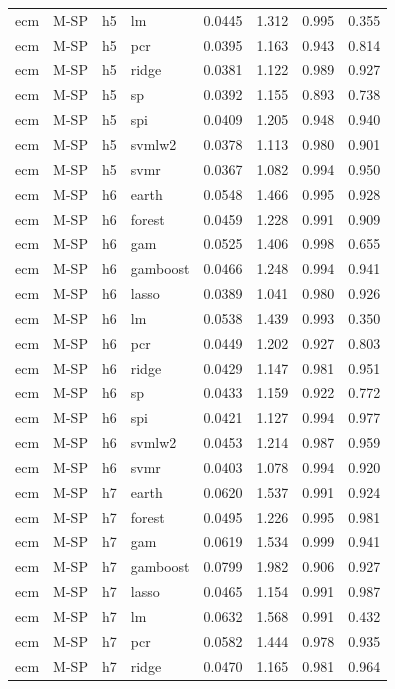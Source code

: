 \begin{ThreePartTable}
\begin{longtable}[t]{llclcccc}
ecm & M-SP & h5 & lm & 0.0445 & 1.312 & 0.995 & 0.355\\
ecm & M-SP & h5 & pcr & 0.0395 & 1.163 & 0.943 & 0.814\\
ecm & M-SP & h5 & ridge & 0.0381 & 1.122 & 0.989 & 0.927\\
ecm & M-SP & h5 & sp & 0.0392 & 1.155 & 0.893 & 0.738\\
ecm & M-SP & h5 & spi & 0.0409 & 1.205 & 0.948 & 0.940\\
ecm & M-SP & h5 & svmlw2 & 0.0378 & 1.113 & 0.980 & 0.901\\
ecm & M-SP & h5 & svmr & 0.0367 & 1.082 & 0.994 & 0.950\\
\addlinespace
ecm & M-SP & h6 & earth & 0.0548 & 1.466 & 0.995 & 0.928\\
ecm & M-SP & h6 & forest & 0.0459 & 1.228 & 0.991 & 0.909\\
ecm & M-SP & h6 & gam & 0.0525 & 1.406 & 0.998 & 0.655\\
ecm & M-SP & h6 & gamboost & 0.0466 & 1.248 & 0.994 & 0.941\\
ecm & M-SP & h6 & lasso & 0.0389 & 1.041 & 0.980 & 0.926\\
ecm & M-SP & h6 & lm & 0.0538 & 1.439 & 0.993 & 0.350\\
ecm & M-SP & h6 & pcr & 0.0449 & 1.202 & 0.927 & 0.803\\
ecm & M-SP & h6 & ridge & 0.0429 & 1.147 & 0.981 & 0.951\\
ecm & M-SP & h6 & sp & 0.0433 & 1.159 & 0.922 & 0.772\\
ecm & M-SP & h6 & spi & 0.0421 & 1.127 & 0.994 & 0.977\\
ecm & M-SP & h6 & svmlw2 & 0.0453 & 1.214 & 0.987 & 0.959\\
ecm & M-SP & h6 & svmr & 0.0403 & 1.078 & 0.994 & 0.920\\
\addlinespace
ecm & M-SP & h7 & earth & 0.0620 & 1.537 & 0.991 & 0.924\\
ecm & M-SP & h7 & forest & 0.0495 & 1.226 & 0.995 & 0.981\\
ecm & M-SP & h7 & gam & 0.0619 & 1.534 & 0.999 & 0.941\\
ecm & M-SP & h7 & gamboost & 0.0799 & 1.982 & 0.906 & 0.927\\
ecm & M-SP & h7 & lasso & 0.0465 & 1.154 & 0.991 & 0.987\\
ecm & M-SP & h7 & lm & 0.0632 & 1.568 & 0.991 & 0.432\\
ecm & M-SP & h7 & pcr & 0.0582 & 1.444 & 0.978 & 0.935\\
ecm & M-SP & h7 & ridge & 0.0470 & 1.165 & 0.981 & 0.964\\

\end{longtable}
\end{ThreePartTable}

